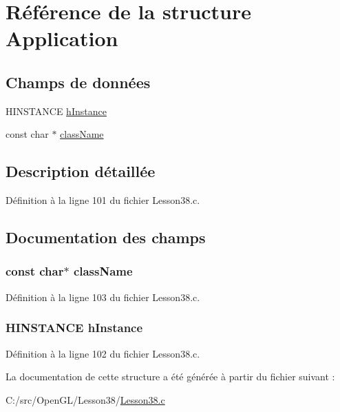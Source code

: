 \hypertarget{struct_application}{}\section{Référence de la structure Application}
\label{struct_application}
\subsection*{Champs de données}
\begin{DoxyCompactItemize}
\item 
H\+I\+N\+S\+T\+A\+N\+CE \hyperlink{struct_application_a74029128723095e7bf00a71d46af8b24}{h\+Instance}
\item 
const char $\ast$ \hyperlink{struct_application_a43ff489793a22a8e71664f7b5cadf1a3}{class\+Name}
\end{DoxyCompactItemize}


\subsection{Description détaillée}


Définition à la ligne 101 du fichier Lesson38.\+c.



\subsection{Documentation des champs}
\subsubsection[{\texorpdfstring{class\+Name}{className}}]{\setlength{\rightskip}{0pt plus 5cm}const char$\ast$ class\+Name}\hypertarget{struct_application_a43ff489793a22a8e71664f7b5cadf1a3}{}\label{struct_application_a43ff489793a22a8e71664f7b5cadf1a3}


Définition à la ligne 103 du fichier Lesson38.\+c.

\subsubsection[{\texorpdfstring{h\+Instance}{hInstance}}]{\setlength{\rightskip}{0pt plus 5cm}H\+I\+N\+S\+T\+A\+N\+CE h\+Instance}\hypertarget{struct_application_a74029128723095e7bf00a71d46af8b24}{}\label{struct_application_a74029128723095e7bf00a71d46af8b24}


Définition à la ligne 102 du fichier Lesson38.\+c.



La documentation de cette structure a été générée à partir du fichier suivant \+:\begin{DoxyCompactItemize}
\item 
C\+:/src/\+Open\+G\+L/\+Lesson38/\hyperlink{_lesson38_8c}{Lesson38.\+c}\end{DoxyCompactItemize}
